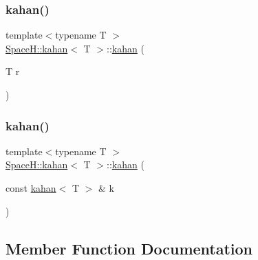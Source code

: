 \mbox{\label{struct_space_h_1_1kahan_a0ba659734c4a20fbb307cfb26b871585}} 
\subsubsection{\texorpdfstring{kahan()}{kahan()}\hspace{0.1cm}{\footnotesize\ttfamily [2/3]}}
{\footnotesize\ttfamily template$<$typename T $>$ \\
\mbox{\hyperlink{struct_space_h_1_1kahan}{Space\+H\+::kahan}}$<$ T $>$\+::\mbox{\hyperlink{struct_space_h_1_1kahan}{kahan}} (\begin{DoxyParamCaption}\item[{T}]{r }\end{DoxyParamCaption})\hspace{0.3cm}{\ttfamily [inline]}}

\mbox{\label{struct_space_h_1_1kahan_a52479b2b99e2fc5174552eee059c70ea}} 
\subsubsection{\texorpdfstring{kahan()}{kahan()}\hspace{0.1cm}{\footnotesize\ttfamily [3/3]}}
{\footnotesize\ttfamily template$<$typename T $>$ \\
\mbox{\hyperlink{struct_space_h_1_1kahan}{Space\+H\+::kahan}}$<$ T $>$\+::\mbox{\hyperlink{struct_space_h_1_1kahan}{kahan}} (\begin{DoxyParamCaption}\item[{const \mbox{\hyperlink{struct_space_h_1_1kahan}{kahan}}$<$ T $>$ \&}]{k }\end{DoxyParamCaption})\hspace{0.3cm}{\ttfamily [inline]}}



\subsection{Member Function Documentation}
\mbox{\label{struct_space_h_1_1kahan_ac818dc8e06b0df33793f3a166dcacdd7}} 
